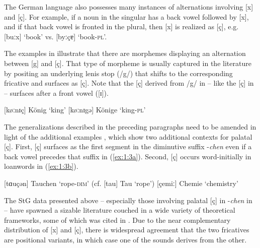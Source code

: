 The German language also possesses many instances of alternations involving [x] and [ç]. For example, if a noun in the singular has a back vowel followed by [x], and if that back vowel is fronted in the plural, then [x] is realized as [ç], e.g. [buːx] ‘book’ vs. [byːçɐ] ‘book-\textsc{pl}’.

The examples in  illustrate that there are morphemes displaying an alternation between [g] and [ç]. That type of morpheme is usually captured in the literature by positing an underlying lenis stop (/g/) that shifts to the corresponding fricative and surfaces as [ç]. Note that the [ç] derived from /g/ in  -- like the [ç] in  -- surfaces after a front vowel ([ɪ]).

\ea\label{ex:1:2}
\ea{}  [køːnɪç]  \tab König  \tab   ‘king’\label{ex:1:2a}
\ex{} [køːnɪgə]  \tab Könige \tab   ‘king-\textsc{pl}’\label{ex:1:2b}
\z
\z

\begin{sloppypar}
The generalizations described in the preceding paragraphs need to be amended in light of the additional examples , which show two additional contexts for palatal [ç]. First, [ç] surfaces as the first segment in the diminutive suffix -\textit{chen} even if a back vowel precedes that suffix in (\ref{ex:1:3a}). Second, [ç] occurs word-initially in loanwords in (\ref{ex:1:3b}).
\end{sloppypar}

\ea%
    \label{ex:1:3}
\ea{}  [tɑuçən] \tab Tauchen \tab ‘rope-\textsc{dim}’  (cf. [tau] Tau ‘rope’)\label{ex:1:3a}
\ex{}  [çemiː]  \tab Chemie  \tab ‘chemistry’\label{ex:1:3b}
\z
\z

The StG data presented above -- especially those involving palatal [ç] in -\textit{chen} in  -- have spawned a sizable literature couched in a wide variety of theoretical frameworks, some of which was cited in . Due to the near complementary distribution of [x] and [ç], there is widespread agreement that the two fricatives are positional variants, in which case one of the sounds derives from the other.


